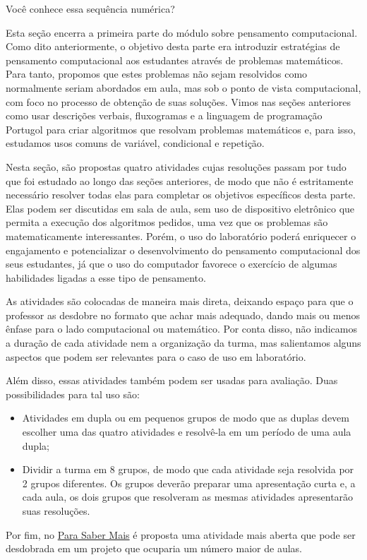 \begin{reflection}
Você conhece essa sequência numérica?
\end{reflection}

\clearmargin
\begin{texto}
{\def\currentcolor{session2}
	Esta seção encerra a primeira parte do módulo sobre pensamento computacional. Como dito anteriormente, o objetivo desta parte era introduzir estratégias de pensamento computacional aos estudantes através de problemas matemáticos. Para tanto, propomos que estes problemas não sejam resolvidos como normalmente seriam abordados em aula, mas sob o ponto de vista computacional, com foco no processo de obtenção de suas soluções. Vimos nas seções anteriores como usar descrições verbais, fluxogramas e a linguagem de programação Portugol para criar algoritmos que resolvam problemas matemáticos e, para isso, estudamos usos comuns de variável, condicional e repetição.

	Nesta seção, são propostas quatro atividades cujas resoluções passam por tudo que foi estudado ao longo das seções anteriores, de modo que não é estritamente necessário resolver todas elas para completar os objetivos específicos desta parte. Elas podem ser discutidas em sala de aula, sem uso de dispositivo eletrônico que permita a execução dos algoritmos pedidos, uma vez que os problemas são matematicamente interessantes. Porém, o uso do laboratório poderá enriquecer o engajamento e potencializar o desenvolvimento do pensamento computacional dos seus estudantes, já que o uso do computador favorece o exercício de algumas habilidades ligadas a esse tipo de pensamento.

	As atividades são colocadas de maneira mais direta, deixando espaço para que o professor as desdobre no formato que achar mais adequado, dando mais ou menos ênfase para o lado computacional ou matemático. Por conta disso, não indicamos a duração de cada atividade nem a organização da turma, mas salientamos alguns aspectos que podem ser relevantes para o caso de uso em laboratório.

	Além disso, essas atividades também podem ser usadas para avaliação. Duas possibilidades para tal uso são:

	\begin{itemize}[topsep=0pt]
	\item Atividades em dupla ou em pequenos grupos de modo que as duplas devem escolher uma das quatro atividades e resolvê-la em um período de uma aula dupla;

	\item Dividir a turma em 8 grupos, de modo que cada atividade seja resolvida por 2 grupos diferentes. Os grupos deverão preparar uma apresentação curta e, a cada aula, os dois grupos que resolveram as mesmas atividades apresentarão suas resoluções.
	\end{itemize}

	Por fim, no \hyperref[comp-know1]{Para Saber Mais} é proposta uma atividade mais aberta que pode ser desdobrada em um projeto que ocuparia um número maior de aulas.
}
\end{texto}

